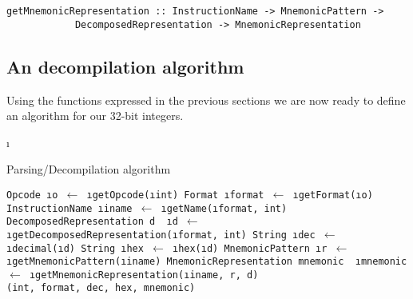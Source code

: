 \begin{verbatim}
getMnemonicRepresentation :: InstructionName -> MnemonicPattern -> 
            DecomposedRepresentation -> MnemonicRepresentation
\end{verbatim}

\subsection{An decompilation algorithm}

Using the functions expressed in the previous sections we are now ready to
define an algorithm for our 32-bit integers.

\LetLtxMacro\i\textit
\newcommand{\get}[2]{\tt{#1} \i{#2} $\gets$ }
\newcommand{\of}[1]{(\i{#1})}
\newcommand{\from}[1]{\i{#1}}

\begin{algorithm}
\caption{Parsing/Decompilation algorithm}\label{algo:decompile}
\begin{algorithmic}[1]
\State \get{Opcode}{o}\from{getOpcode}\of{int}
\State \get{Format}{format}\from{getFormat}\of{o}
\State \get{InstructionName}{iname}\from{getName}\of{format, int}
\State \tt{DecomposedRepresentation} d
\State \get{}{d}\from{getDecomposedRepresentation}\of{format, int}
\State \get{String}{dec}\from{decimal}\of{d}
\State \get{String}{hex}\from{hex}\of{d}
\State \get{MnemonicPattern}{r}\from{getMnemonicPattern}\of{iname}
\State \tt{MnemonicRepresentation} mnemonic
\State \get{}{mnemonic}\from{getMnemonicRepresentation}\of{iname, r, d} \\
\Return (int, format, dec, hex, mnemonic)
\EndProcedure
\end{algorithmic}
\end{algorithm}



